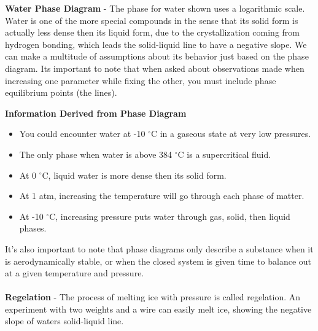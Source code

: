 \documentclass{article}
\begin{document}
\begin{minipage}{0.47\textwidth}

\end{minipage}
\begin{minipage}{0.605\textwidth}

	\textbf{Water Phase Diagram} - The phase for water shown uses a logarithmic scale. Water is one of the more special compounds in the sense that its solid form is actually less dense then its liquid form, due to the crystallization coming from hydrogen bonding, which leads the solid-liquid line to have a negative slope. We can make a multitude of assumptions about its behavior just based on the phase diagram. Its important to note that when asked about observations made when increasing one parameter while fixing the other, you must include phase equilibrium points (the lines).

\end{minipage}

\begin{qq}

	\textbf{Information Derived from Phase Diagram}
	\begin{itemize}[leftmargin=*]
		\item You could encounter water at -10 $^{\circ}$C in a gaseous state at very low pressures.
		\item The only phase when water is above 384 $^{\circ}$C is a supercritical fluid.
		\item At 0 $^{\circ}$C, liquid water is more dense then its solid form.
		\item At 1 atm, increasing the temperature will go through each phase of matter.
		\item At -10 $^{\circ}$C, increasing pressure puts water through gas, solid, then liquid phases.
	\end{itemize}

\end{qq}

\vspace{5pt}
\noindent It's also important to note that phase diagrams only describe a substance when it is aerodynamically stable, or when the closed system is given time to balance out at a given temperature and pressure.\\
\\
\textbf{Regelation} - The process of melting ice with pressure is called regelation. An experiment with two weights and a wire can easily melt ice, showing the negative slope of waters solid-liquid line.
\end{document}
